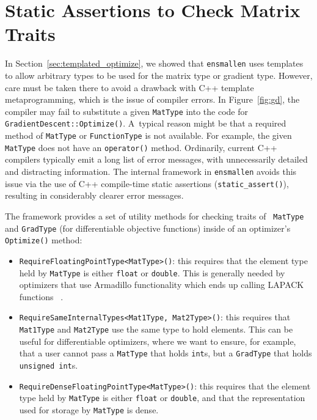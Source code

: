 \section{Static Assertions to Check Matrix Traits}
\label{sec:templated_optimize_details}

In Section~\ref{sec:templated_optimize}, we showed that {\tt ensmallen} uses
templates to allow arbitrary types to be used for the matrix type or gradient
type.
However, care must be taken there to avoid a drawback with C++ template metaprogramming,
which is the issue of compiler errors.
In Figure~\ref{fig:gd}, the compiler may fail to substitute a given {\tt MatType}
into the code for {\tt GradientDescent::Optimize()}. A~typical reason might be that
a required method of {\tt MatType} or {\tt FunctionType} is not available.
For example, the given {\tt MatType} does not have an {\tt operator\*()} method.
Ordinarily, current C++ compilers typically emit a long list of error messages,
with unnecessarily detailed and distracting information.
The internal framework in {\tt ensmallen} avoids this issue via the use of
C++ compile-time static assertions ({\tt static\_assert()}),
resulting in considerably clearer error messages.

The framework provides a set of utility methods for checking traits of {\tt
MatType} and {\tt GradType} (for differentiable objective functions) inside of
an optimizer's {\tt Optimize()} method:

\begin{itemize}
  \item {\tt RequireFloatingPointType<MatType>()}: this requires that the
element type held by {\tt MatType} is either {\tt float} or {\tt double}.
This is generally needed by optimizers that use Armadillo functionality which
ends up calling LAPACK functions~\cite{TODO} .

  \item {\tt RequireSameInternalTypes<Mat1Type, Mat2Type>()}: this requires that
{\tt Mat1Type} and {\tt Mat2Type} use the same type to hold elements.  This can
be useful for differentiable optimizers, where we want to ensure, for example,
that a user cannot pass a {\tt MatType} that holds {\tt int}s, but a {\tt GradType} that
holds {\tt unsigned int}s.

  \item {\tt RequireDenseFloatingPointType<MatType>()}: this requires that the
element type held by {\tt MatType} is either {\tt float} or {\tt double}, and
that the representation used for storage by {\tt MatType} is dense.
\end{itemize}

